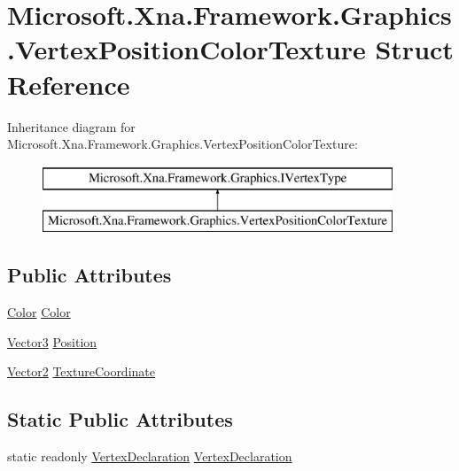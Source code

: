 \hypertarget{struct_microsoft_1_1_xna_1_1_framework_1_1_graphics_1_1_vertex_position_color_texture}{}\section{Microsoft.\+Xna.\+Framework.\+Graphics.\+Vertex\+Position\+Color\+Texture Struct Reference}
\label{struct_microsoft_1_1_xna_1_1_framework_1_1_graphics_1_1_vertex_position_color_texture}
Inheritance diagram for Microsoft.\+Xna.\+Framework.\+Graphics.\+Vertex\+Position\+Color\+Texture\+:\begin{figure}[H]
\begin{center}
\leavevmode
\includegraphics[height=2.000000cm]{struct_microsoft_1_1_xna_1_1_framework_1_1_graphics_1_1_vertex_position_color_texture}
\end{center}
\end{figure}
\subsection*{Public Attributes}
\begin{DoxyCompactItemize}
\item 
\hyperlink{struct_microsoft_1_1_xna_1_1_framework_1_1_color}{Color} \hyperlink{struct_microsoft_1_1_xna_1_1_framework_1_1_graphics_1_1_vertex_position_color_texture_a6b1a1f5ac440b16cfff4a34af662b0b3}{Color}
\item 
\hyperlink{struct_microsoft_1_1_xna_1_1_framework_1_1_vector3}{Vector3} \hyperlink{struct_microsoft_1_1_xna_1_1_framework_1_1_graphics_1_1_vertex_position_color_texture_a3158f58f279e2e57cf51ebe01ba33b12}{Position}
\item 
\hyperlink{struct_microsoft_1_1_xna_1_1_framework_1_1_vector2}{Vector2} \hyperlink{struct_microsoft_1_1_xna_1_1_framework_1_1_graphics_1_1_vertex_position_color_texture_ad251a4052d6f22addba2aabaf99e4b3f}{Texture\+Coordinate}
\end{DoxyCompactItemize}
\subsection*{Static Public Attributes}
\begin{DoxyCompactItemize}
\item 
static readonly \hyperlink{class_microsoft_1_1_xna_1_1_framework_1_1_graphics_1_1_vertex_declaration}{Vertex\+Declaration} \hyperlink{struct_microsoft_1_1_xna_1_1_framework_1_1_graphics_1_1_vertex_position_color_texture_a73ca19f8a4679d00baf9351b19ee6c34}{Vertex\+Declaration}
\end{DoxyCompactItemize}


